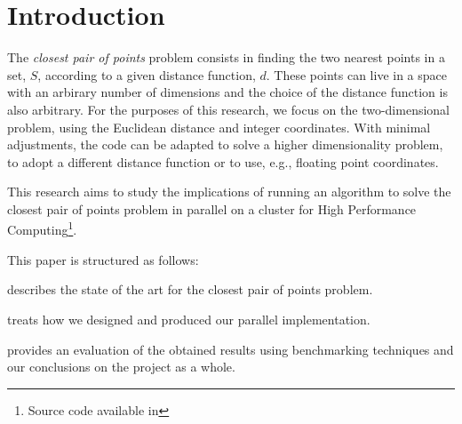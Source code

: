 \section{Introduction}
\label{sec:introduction}

The \textit{closest pair of points} problem consists
in finding the two nearest points in a set, $S$, according to a given distance function, $d$\cite{closest_pair_definition}.
These points can live in a space with an arbirary number of dimensions
and the choice of the distance function is also arbitrary.
For the purposes of this research, we focus on the two-dimensional problem, using the Euclidean distance and integer coordinates.
With minimal adjustments, the code can be adapted to solve a higher dimensionality problem, to adopt a different distance function or to use, e.g., floating point coordinates.

This research aims to study the implications of running an algorithm to solve the closest pair of points problem in parallel on a cluster for High Performance Computing\footnote{Source code available in }.

This paper is structured as follows:
\begin{inlinelist}
    \item {} describes the state of the art for the closest pair of points problem.
    \item {} treats how we designed and produced our parallel implementation.
    \item {} provides an evaluation of the obtained results using benchmarking techniques and our conclusions on the project as a whole.
\end{inlinelist}
